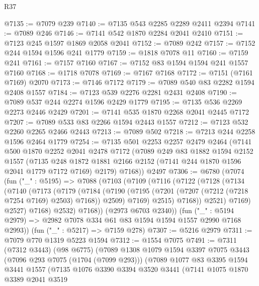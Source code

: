 \begin{lexlean}{R37}
\begin{coremodule}
@7135 := @7079 @239
@7140 := @7135 @543 @2285 @2289 @2411 @2394
@7141 := @7089 @246
@7146 := @7141 @542 @1870 @2284 @2041 @2410
@7151 := @7123 @245 @1597 @1869 @2058 @2041
@7152 := @7089 @242
@7157 := @7152 @244 @1594 @1596 @241 @1779
@7159 := @1818 @7078 @11
@7160 := @7159 @241
@7161 := @7157 @7160
@7167 := @7152 @83 @1594 @1594 @241 @1557 @7160
@7168 := @1718 @7078
@7169 := @7167 @7168
@7172 := @7151 (@7161 @7169) @2070
@7173 := @7146 @7172
@7179 := @7089 @540 @83 @2282 @1594 @2408 @1557
@7184 := @7123 @539 @2276 @2281 @2431 @2408
@7190 := @7089 @537 @244 @2274 @1596 @2429 @1779
@7195 := @7135 @536 @2269 @2273 @2446 @2429
@7201 := @7141 @535 @1870 @2268 @2041 @2445 @7172
@7207 := @7089 @533 @83 @2266 @1594 @2443 @1557
@7212 := @7123 @532 @2260 @2265 @2466 @2443
@7213 := @7089 @502
@7218 := @7213 @244 @2258 @1596 @2464 @1779
@7254 := @7135
    @501
    @2253
    @2257
    @2479
    @2464
    (@7141
      @500
      @1870
      @2252
      @2041
      @2478
      @7172
      (@7089
        @249
        @83
        @1882
        @1594
        @2152
        @1557
        (@7135 @248 @1872 @1881 @2166 @2152 (@7141 @244 @1870 @1596 @2041 @1779 @7172 @7169) @2179)
        @7168))
    @2497
@7306 := @6780
    (@7074
      (fun ("_" : @5195) =>
      @7088
        (@7103
          (@7109
            (@7116
              (@7122
                (@7128
                  (@7134
                    (@7140
                      (@7173
                        (@7179
                          (@7184
                            (@7190
                              (@7195 (@7201 (@7207 (@7212 (@7218 @7254 @7169) @2503) @7168)) @2509)
                              @7169)
                            @2515)
                          @7168))
                      @2521)
                    @7169)
                  @2527)
                @7168)
              @2532)
            @7168))
        (@2973 @6703 @2340))
      (fun ("_" : @5194 @2979) => @2982 @7078 @334 @61 @83 @1594 @1594 @1557 @2990 @7168 @2993))
    (fun ("_" : @5217) => @7159 @278)
@7307 := @5216 @2979
@7311 := @7079 @770 @1319 @5223 @1594
@7312 := @1554 @7075
@7491 := @7311
    (@7312 @3443)
    (@98 @6775)
    (@7089
      @1308
      @1079
      @1594
      @3397
      @7075
      @3443
      (@7096 @293 @7075 (@1704 (@7099 @293)))
      (@7089
        @1077
        @83
        @3395
        @1594
        @3441
        @1557
        (@7135
          @1076
          @3390
          @3394
          @3520
          @3441
          (@7141
            @1075
            @1870
            @3389
            @2041
            @3519

\end{coremodule}
\end{lexlean}
